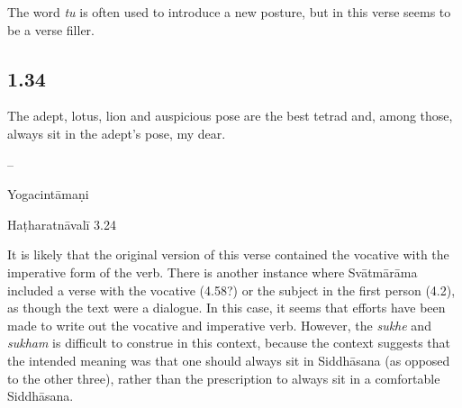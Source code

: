\begin{ekdosis}
\begin{philcomm}[hp01_033]
The word \emph{tu} is often used to introduce a new posture, but in this verse seems to be a verse filler.
\end{philcomm}

\subsection*{1.34}
\begin{translation}[hp01_034]
The adept, lotus, lion and auspicious pose are the best tetrad and, among those, always sit in the adept’s pose, my dear.
\end{translation}

\begin{sources}[hp01_034]
--
\end{sources}

\begin{testimonia}[hp01_034]
Yogacintāmaṇi

\begin{versinnote}
\end{versinnote}

Haṭharatnāvalī 3.24

\begin{versinnote}
\end{versinnote}

\end{testimonia}

\begin{philcomm}[hp01_034]
It is likely that the original version of this verse contained the vocative with the imperative form of the verb. There is another instance where Svātmārāma included a verse with the vocative (4.58?) or the subject in the first person (4.2), as though the text were a dialogue. In this case, it seems that efforts have been made to write out the vocative and imperative verb. However, the \emph{sukhe} and \emph{sukham} is difficult to construe in this context, because the context suggests that the intended meaning was that one should always sit in Siddhāsana (as opposed to the other three), rather than the prescription to always sit in a comfortable Siddhāsana.   
\end{philcomm}


\end{ekdosis}
